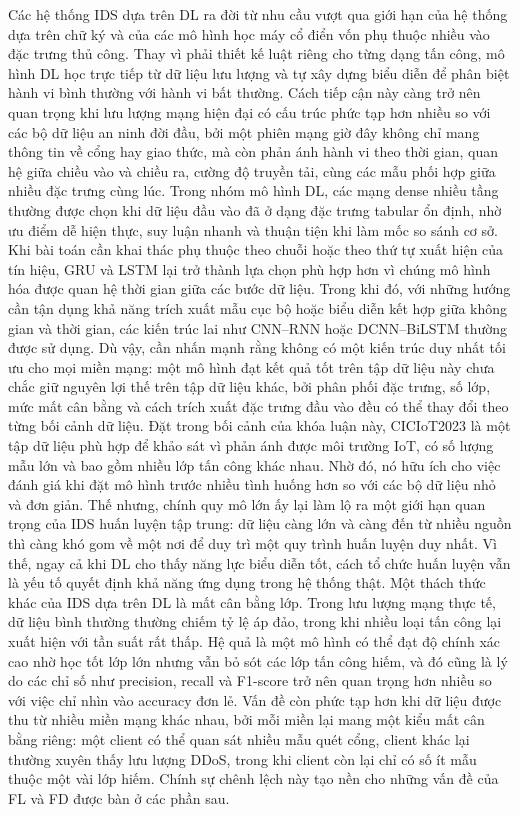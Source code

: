 Các hệ thống IDS dựa trên DL ra đời từ nhu cầu vượt qua giới hạn của hệ thống dựa trên chữ ký và của các mô hình học máy cổ điển vốn phụ thuộc nhiều vào đặc trưng thủ công. Thay vì phải thiết kế luật riêng cho từng dạng tấn công, mô hình DL học trực tiếp từ dữ liệu lưu lượng và tự xây dựng biểu diễn để phân biệt hành vi bình thường với hành vi bất thường. Cách tiếp cận này càng trở nên quan trọng khi lưu lượng mạng hiện đại có cấu trúc phức tạp hơn nhiều so với các bộ dữ liệu an ninh đời đầu, bởi một phiên mạng giờ đây không chỉ mang thông tin về cổng hay giao thức, mà còn phản ánh hành vi theo thời gian, quan hệ giữa chiều vào và chiều ra, cường độ truyền tải, cùng các mẫu phối hợp giữa nhiều đặc trưng cùng lúc.
\bigbreak\noindent
Trong nhóm mô hình DL, các mạng dense nhiều tầng thường được chọn khi dữ liệu đầu vào đã ở dạng đặc trưng tabular ổn định, nhờ ưu điểm dễ hiện thực, suy luận nhanh và thuận tiện khi làm mốc so sánh cơ sở. Khi bài toán cần khai thác phụ thuộc theo chuỗi hoặc theo thứ tự xuất hiện của tín hiệu, GRU và LSTM lại trở thành lựa chọn phù hợp hơn vì chúng mô hình hóa được quan hệ thời gian giữa các bước dữ liệu. Trong khi đó, với những hướng cần tận dụng khả năng trích xuất mẫu cục bộ hoặc biểu diễn kết hợp giữa không gian và thời gian, các kiến trúc lai như CNN--RNN hoặc DCNN--BiLSTM thường được sử dụng. Dù vậy, cần nhấn mạnh rằng không có một kiến trúc duy nhất tối ưu cho mọi miền mạng: một mô hình đạt kết quả tốt trên tập dữ liệu này chưa chắc giữ nguyên lợi thế trên tập dữ liệu khác, bởi phân phối đặc trưng, số lớp, mức mất cân bằng và cách trích xuất đặc trưng đầu vào đều có thể thay đổi theo từng bối cảnh dữ liệu.
\bigbreak\noindent
Đặt trong bối cảnh của khóa luận này, CICIoT2023 là một tập dữ liệu phù hợp để khảo sát vì phản ánh được môi trường IoT, có số lượng mẫu lớn và bao gồm nhiều lớp tấn công khác nhau. Nhờ đó, nó hữu ích cho việc đánh giá khi đặt mô hình trước nhiều tình huống hơn so với các bộ dữ liệu nhỏ và đơn giản. Thế nhưng, chính quy mô lớn ấy lại làm lộ ra một giới hạn quan trọng của IDS huấn luyện tập trung: dữ liệu càng lớn và càng đến từ nhiều nguồn thì càng khó gom về một nơi để duy trì một quy trình huấn luyện duy nhất. Vì thế, ngay cả khi DL cho thấy năng lực biểu diễn tốt, cách tổ chức huấn luyện vẫn là yếu tố quyết định khả năng ứng dụng trong hệ thống thật.
\bigbreak\noindent
Một thách thức khác của IDS dựa trên DL là mất cân bằng lớp. Trong lưu lượng mạng thực tế, dữ liệu bình thường thường chiếm tỷ lệ áp đảo, trong khi nhiều loại tấn công lại xuất hiện với tần suất rất thấp. Hệ quả là một mô hình có thể đạt độ chính xác cao nhờ học tốt lớp lớn nhưng vẫn bỏ sót các lớp tấn công hiếm, và đó cũng là lý do các chỉ số như precision, recall và F1-score trở nên quan trọng hơn nhiều so với việc chỉ nhìn vào accuracy đơn lẻ. Vấn đề còn phức tạp hơn khi dữ liệu được thu từ nhiều miền mạng khác nhau, bởi mỗi miền lại mang một kiểu mất cân bằng riêng: một client có thể quan sát nhiều mẫu quét cổng, client khác lại thường xuyên thấy lưu lượng DDoS, trong khi client còn lại chỉ có số ít mẫu thuộc một vài lớp hiếm. Chính sự chênh lệch này tạo nền cho những vấn đề của FL và FD được bàn ở các phần sau.
